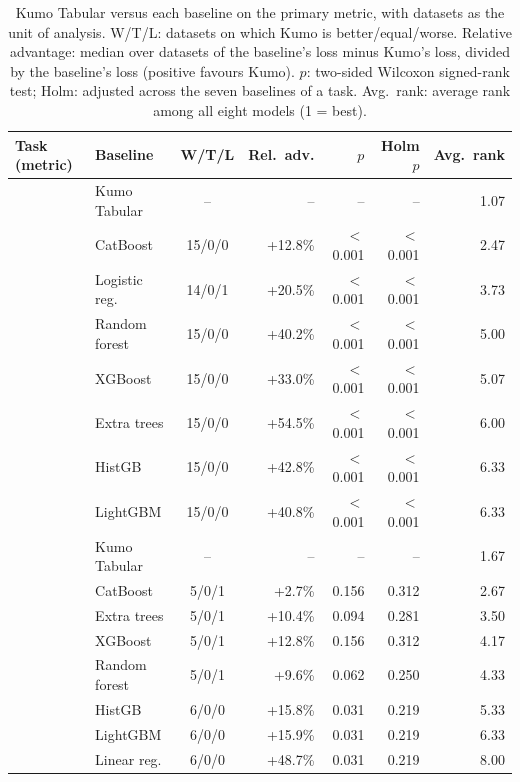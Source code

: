 \begin{table}[t]
\centering
\small
\caption{Kumo Tabular versus each baseline on the primary metric, with datasets as the unit of analysis. W/T/L: datasets on which Kumo is better/equal/worse. Relative advantage: median over datasets of the baseline's loss minus Kumo's loss, divided by the baseline's loss (positive favours Kumo). $p$: two-sided Wilcoxon signed-rank test; Holm: adjusted across the seven baselines of a task. Avg.\ rank: average rank among all eight models (1 = best).}
\label{tab:comparison}
\begin{tabular}{llcrrrr}
\toprule
Task (metric) & Baseline & W/T/L & Rel.\ adv. & $p$ & Holm $p$ & Avg.\ rank \\
\midrule
{} & Kumo Tabular & -- & -- & -- & -- & 1.07 \\
& CatBoost & 15/0/0 & +12.8\% & $<$0.001 & $<$0.001 & 2.47 \\
& Logistic reg. & 14/0/1 & +20.5\% & $<$0.001 & $<$0.001 & 3.73 \\
& Random forest & 15/0/0 & +40.2\% & $<$0.001 & $<$0.001 & 5.00 \\
& XGBoost & 15/0/0 & +33.0\% & $<$0.001 & $<$0.001 & 5.07 \\
& Extra trees & 15/0/0 & +54.5\% & $<$0.001 & $<$0.001 & 6.00 \\
& HistGB & 15/0/0 & +42.8\% & $<$0.001 & $<$0.001 & 6.33 \\
& LightGBM & 15/0/0 & +40.8\% & $<$0.001 & $<$0.001 & 6.33 \\
\midrule
{} & Kumo Tabular & -- & -- & -- & -- & 1.67 \\
& CatBoost & 5/0/1 & +2.7\% & 0.156 & 0.312 & 2.67 \\
& Extra trees & 5/0/1 & +10.4\% & 0.094 & 0.281 & 3.50 \\
& XGBoost & 5/0/1 & +12.8\% & 0.156 & 0.312 & 4.17 \\
& Random forest & 5/0/1 & +9.6\% & 0.062 & 0.250 & 4.33 \\
& HistGB & 6/0/0 & +15.8\% & 0.031 & 0.219 & 5.33 \\
& LightGBM & 6/0/0 & +15.9\% & 0.031 & 0.219 & 6.33 \\
& Linear reg. & 6/0/0 & +48.7\% & 0.031 & 0.219 & 8.00 \\
\bottomrule
\end{tabular}
\end{table}
